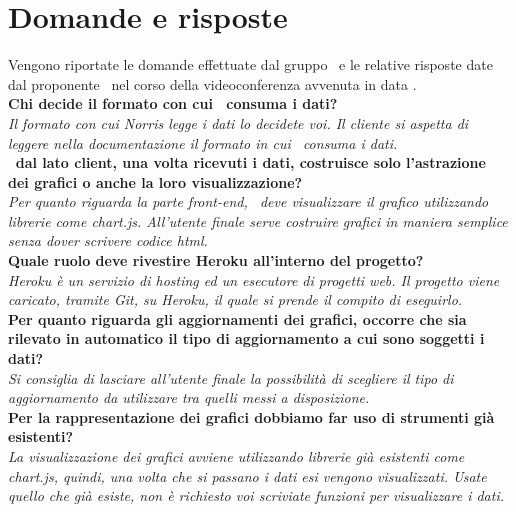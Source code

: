 
\section{Domande e risposte}
	Vengono riportate le domande effettuate dal gruppo \groupname\ e le relative risposte date dal proponente \proponente\, nel corso della videoconferenza avvenuta in data .\\
	
	\textbf{Chi decide il formato con cui \projectname\ consuma i dati?}\\
	\textit{Il formato con cui Norris legge i dati lo decidete voi. Il cliente si aspetta di leggere nella documentazione il formato in cui \projectname\ consuma i dati.}\\
	
	\textbf{\projectname\, dal lato client, una volta ricevuti i dati, costruisce solo l'astrazione dei grafici o anche la loro visualizzazione?}\\
	\textit{Per quanto riguarda la parte front-end, \projectname\ deve visualizzare il grafico utilizzando librerie come chart.js. All'utente finale serve costruire grafici in maniera semplice senza dover scrivere codice html.}\\
	
	\textbf{Quale ruolo deve rivestire Heroku all'interno del progetto?}\\
	\textit{Heroku è un servizio di hosting ed un esecutore di progetti web. Il progetto viene caricato, tramite Git, su Heroku, il quale si prende il compito di eseguirlo.}\\
	
	\textbf{Per quanto riguarda gli aggiornamenti dei grafici, occorre che sia rilevato in automatico il tipo di aggiornamento a cui sono soggetti i dati?}\\
	\textit{Si consiglia di lasciare all'utente finale la possibilità di scegliere il tipo di aggiornamento da utilizzare tra quelli messi a disposizione.}\\
	
	\textbf{Per la rappresentazione dei grafici dobbiamo far uso di strumenti già esistenti?}\\
	\textit{La visualizzazione dei grafici avviene utilizzando librerie già esistenti come chart.js, quindi, una volta che si passano i dati esi vengono visualizzati. Usate quello che già esiste, non è richiesto voi scriviate funzioni per visualizzare i dati.}\\
	
